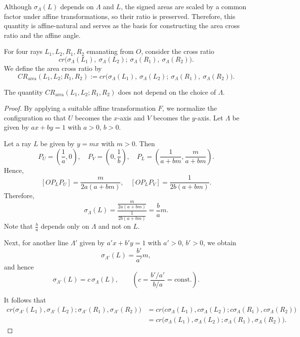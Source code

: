 \documentclass[12pt]{article}
\begin{document}
Although $\sigma_\Lambda(L)$ depends on $\Lambda$ and $L$,
the signed areas are scaled by a common factor under affine transformations,
so their ratio is preserved.
Therefore, this quantity is affine-natural
and serves as the basis for constructing the area cross ratio
and the affine angle.


\begin{definition}
For four rays $L_1, L_2, R_1, R_2$ emanating from $O$,
consider the cross ratio
\[
cr\bigl(\sigma_\Lambda(L_1),\ \sigma_\Lambda(L_2);\ 
\sigma_\Lambda(R_1),\ \sigma_\Lambda(R_2)\bigr).
\]
We define the area cross ratio by
\[
CR_{\mathrm{area}}(L_1,L_2;R_1,R_2)
:=
cr\bigl(\sigma_\Lambda(L_1),\ \sigma_\Lambda(L_2);\ 
\sigma_\Lambda(R_1),\ \sigma_\Lambda(R_2)\bigr).
\]
\end{definition}


\begin{theorem}\label{thm:CR-Lambda-property}
The quantity $CR_{\mathrm{area}}(L_1,L_2;R_1,R_2)$
does not depend on the choice of $\Lambda$.
\end{theorem}

\begin{proof}
By applying a suitable affine transformation $F$, we normalize the configuration
so that $U$ becomes the $x$-axis and $V$ becomes the $y$-axis.
Let $\Lambda$ be given by $ax+by=1$ with $a>0$, $b>0$.

Let a ray $L$ be given by $y=mx$ with $m>0$.
Then
\[
P_U=\left(\frac{1}{a},0\right), \quad
P_V=\left(0,\frac{1}{b}\right), \quad
P_L=\left(\frac{1}{a+bm},\frac{m}{a+bm}\right).
\]
Hence,
\[
[OP_LP_U]=\frac{m}{2a(a+bm)}, \quad
[OP_LP_V]=\frac{1}{2b(a+bm)}.
\]
Therefore,
\[
\sigma_\Lambda(L)
=
\frac{\frac{m}{2a(a+bm)}}{\frac{1}{2b(a+bm)}}
=
\frac{b}{a}m.
\]
Note that $\frac{b}{a}$ depends only on $\Lambda$ and not on $L$.

Next, for another line $\Lambda'$ given by $a'x+b'y=1$ with $a'>0$, $b'>0$,
we obtain
\[
\sigma_{\Lambda'}(L)=\frac{b'}{a'}m,
\]
and hence
\[
\sigma_{\Lambda'}(L)=c\,\sigma_\Lambda(L),
\qquad
\left(c=\frac{b'/a'}{b/a}=\mathrm{const.}\right).
\]

It follows that
\begin{align*}
cr\bigl(\sigma_{\Lambda'}(L_1),\sigma_{\Lambda'}(L_2);\sigma_{\Lambda'}(R_1),\sigma_{\Lambda'}(R_2)\bigr)
&=
cr\bigl(c\sigma_{\Lambda}(L_1),c\sigma_{\Lambda}(L_2);
c\sigma_{\Lambda}(R_1),c\sigma_{\Lambda}(R_2)\bigr)\\
&=
cr\bigl(\sigma_{\Lambda}(L_1),\sigma_{\Lambda}(L_2);
\sigma_{\Lambda}(R_1),\sigma_{\Lambda}(R_2)\bigr).
\end{align*}
\end{proof}
\end{document}
